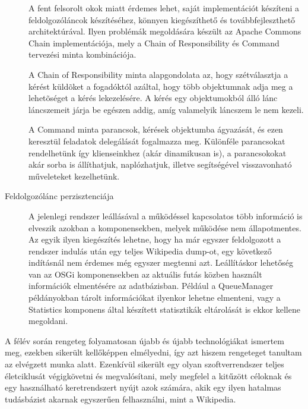 \begin{description}
A fent felsorolt okok miatt érdemes lehet, saját implementációt készíteni a feldolgozóláncok készítéséhez, könnyen kiegészíthető és továbbfejleszthető architektúrával. Ilyen problémák megoldására készült az Apache Commons Chain implementációja, mely a Chain of Responsibility és Command tervezési minta kombinációja.
    
A Chain of Responsibility minta alapgondolata az, hogy szétválasztja a kérést küldõket a fogadóktól azáltal, hogy több objektumnak adja meg a lehetõséget a kérés lekezelésére. A kérés egy objektumokból álló lánc láncszemeit járja be egészen addig, amíg valamelyik láncszem le nem kezeli.
    
A Command minta parancsok, kérések objektumba ágyazását, és ezen keresztül feladatok delegálását fogalmazza meg. Különféle parancsokat rendelhetünk így klienseinkhez (akár dinamikusan is), a parancsokokat akár sorba is állíthatjuk, naplózhatjuk, illetve segítségével visszavonható műveleteket kezelhetünk.
    
    \item[Feldolgozólánc perzisztenciája] A jelenlegi rendszer leállásával a működéssel kapcsolatos több információ is elveszik azokban a komponensekben, melyek működése nem állapotmentes. Az egyik ilyen kiegészítés lehetne, hogy ha már egyszer feldolgozott a rendszer indulás után egy teljes Wikipedia dump-ot, egy következő indításnál nem érdemes még egyszer megtenni azt.
Leállításkor lehetőség van az OSGi komponensekben az aktuális futás közben használt információk elmentésére az adatbázisban. Például a QueueManager példányokban tárolt információkat ilyenkor lehetne elmenteni, vagy a Statistics komponens által készített statisztikák eltárolását is ekkor kellene megoldani.
\end{description}

A félév során rengeteg folyamatosan újabb és újabb technológiákat ismertem meg, ezekben sikerült kellőképpen elmélyedni, így azt hiszem rengeteget tanultam az elvégzett munka alatt. Ezenkívül sikerült egy olyan szoftverrendszer teljes életciklusát végigkövetni és megvalósítani, mely megfelel a kitűzött céloknak és egy használható keretrendszert nyújt azok számára, akik egy ilyen hatalmas tudásbázist akarnak egyszerűen felhasználni, mint a Wikipedia.


